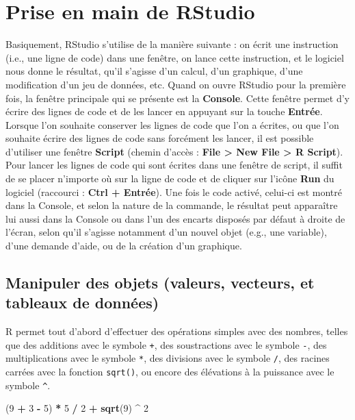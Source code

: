 \documentclass[
  french,
]{book}
\newenvironment{Shaded}{\begin{snugshade}}{\end{snugshade}}
\newcommand{\DecValTok}[1]{\textcolor[rgb]{0.00,0.00,0.81}{#1}}
\newcommand{\KeywordTok}[1]{\textcolor[rgb]{0.13,0.29,0.53}{\textbf{#1}}}
\newcommand{\NormalTok}[1]{#1}
\newcommand{\OperatorTok}[1]{\textcolor[rgb]{0.81,0.36,0.00}{\textbf{#1}}}
\newcommand{\StringTok}[1]{\textcolor[rgb]{0.31,0.60,0.02}{#1}}
\begin{document}
\hypertarget{prise-en-main-de-rstudio}{%
\section{Prise en main de RStudio}\label{prise-en-main-de-rstudio}}

Basiquement, RStudio s'utilise de la manière suivante : on écrit une instruction (i.e., une ligne de code) dans une fenêtre, on lance cette instruction, et le logiciel nous donne le résultat, qu'il s'agisse d'un calcul, d'un graphique, d'une modification d'un jeu de données, etc. Quand on ouvre RStudio pour la première fois, la fenêtre principale qui se présente est la \textbf{Console}. Cette fenêtre permet d'y écrire des lignes de code et de les lancer en appuyant sur la touche \textbf{Entrée}. Lorsque l'on souhaite conserver les lignes de code que l'on a écrites, ou que l'on souhaite écrire des lignes de code sans forcément les lancer, il est possible d'utiliser une fenêtre \textbf{Script} (chemin d'accès : \textbf{File \textgreater{} New File \textgreater{} R Script}). Pour lancer les lignes de code qui sont écrites dans une fenêtre de script, il suffit de se placer n'importe où sur la ligne de code et de cliquer sur l'icône \textbf{Run} du logiciel (raccourci : \textbf{Ctrl + Entrée}). Une fois le code activé, celui-ci est montré dans la Console, et selon la nature de la commande, le résultat peut apparaître lui aussi dans la Console ou dans l'un des encarts disposés par défaut à droite de l'écran, selon qu'il s'agisse notamment d'un nouvel objet (e.g., une variable), d'une demande d'aide, ou de la création d'un graphique.

\hypertarget{manipuler-des-objets-valeurs-vecteurs-et-tableaux-de-donnuxe9es}{%
\subsection{Manipuler des objets (valeurs, vecteurs, et tableaux de données)}\label{manipuler-des-objets-valeurs-vecteurs-et-tableaux-de-donnuxe9es}}

R permet tout d'abord d'effectuer des opérations simples avec des nombres, telles que des additions avec le symbole \texttt{+}, des soustractions avec le symbole \texttt{-}, des multiplications avec le symbole \texttt{*}, des divisions avec le symbole \texttt{/}, des racines carrées avec la fonction \texttt{sqrt()}, ou encore des élévations à la puissance avec le symbole \texttt{\^{}}.

\begin{Shaded}
\begin{Highlighting}[]
\NormalTok{(}\DecValTok{9} \OperatorTok{+}\StringTok{ }\DecValTok{3} \OperatorTok{-}\StringTok{ }\DecValTok{5}\NormalTok{) }\OperatorTok{*}\StringTok{ }\DecValTok{5} \OperatorTok{/}\StringTok{ }\DecValTok{2} \OperatorTok{+}\StringTok{ }\KeywordTok{sqrt}\NormalTok{(}\DecValTok{9}\NormalTok{) }\OperatorTok{^}\StringTok{ }\DecValTok{2}
\end{Highlighting}
\end{Shaded}
\end{document}
